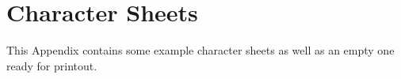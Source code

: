 \chapter{Character Sheets}\label{app:character-sheets}
This Appendix contains some example character sheets as well as an empty one ready for printout.



